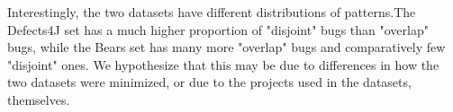 
Interestingly, the two datasets have different distributions of patterns.The Defects4J set has a much higher proportion of "disjoint" bugs than "overlap" bugs, while the Bears set has many more "overlap" bugs and comparatively few "disjoint" ones. We hypothesize that this may be due to differences in how the two datasets were minimized, or due to the projects used in the datasets, themselves. 



